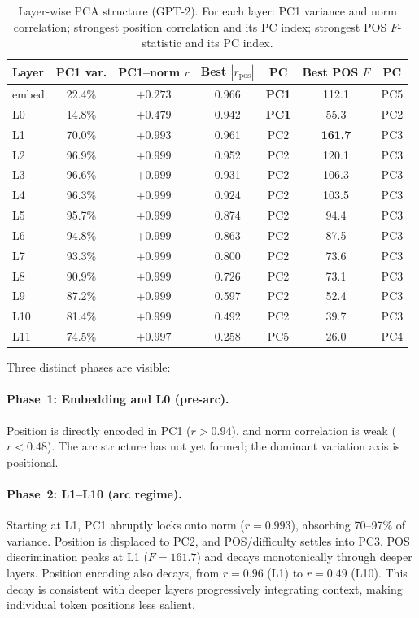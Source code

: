 \documentclass[11pt,a4paper]{article}
\begin{document}
\begin{table}[H]
\centering
\caption{Layer-wise PCA structure (GPT-2). For each layer: PC1 variance and norm correlation; strongest position correlation and its PC index; strongest POS $F$-statistic and its PC index.}
\label{tab:layerwise}
\begin{tabular}{lcccccc}
\toprule
Layer & PC1 var. & PC1--norm $r$ & Best $|r_\text{pos}|$ & PC & Best POS $F$ & PC \\
\midrule
embed & 22.4\% & $+0.273$ & 0.966 & \textbf{PC1} & 112.1 & PC5 \\
L0    & 14.8\% & $+0.479$ & 0.942 & \textbf{PC1} & 55.3  & PC2 \\
L1    & 70.0\% & $+0.993$ & 0.961 & PC2           & \textbf{161.7} & PC3 \\
L2    & 96.9\% & $+0.999$ & 0.952 & PC2           & 120.1 & PC3 \\
L3    & 96.6\% & $+0.999$ & 0.931 & PC2           & 106.3 & PC3 \\
L4    & 96.3\% & $+0.999$ & 0.924 & PC2           & 103.5 & PC3 \\
L5    & 95.7\% & $+0.999$ & 0.874 & PC2           & 94.4  & PC3 \\
L6    & 94.8\% & $+0.999$ & 0.863 & PC2           & 87.5  & PC3 \\
L7    & 93.3\% & $+0.999$ & 0.800 & PC2           & 73.6  & PC3 \\
L8    & 90.9\% & $+0.999$ & 0.726 & PC2           & 73.1  & PC3 \\
L9    & 87.2\% & $+0.999$ & 0.597 & PC2           & 52.4  & PC3 \\
L10   & 81.4\% & $+0.999$ & 0.492 & PC2           & 39.7  & PC3 \\
L11   & 74.5\% & $+0.997$ & 0.258 & PC5           & 26.0  & PC4 \\
\bottomrule
\end{tabular}
\end{table}

Three distinct phases are visible:

\paragraph{Phase~1: Embedding and L0 (pre-arc).} Position is directly encoded in PC1 ($r > 0.94$), and norm correlation is weak ($r < 0.48$). The arc structure has not yet formed; the dominant variation axis is positional.

\paragraph{Phase~2: L1--L10 (arc regime).} Starting at L1, PC1 abruptly locks onto norm ($r = 0.993$), absorbing 70--97\% of variance. Position is displaced to PC2, and POS/difficulty settles into PC3. POS discrimination peaks at L1 ($F = 161.7$) and decays monotonically through deeper layers. Position encoding also decays, from $r = 0.96$ (L1) to $r = 0.49$ (L10). This decay is consistent with deeper layers progressively integrating context, making individual token positions less salient.
\end{document}

